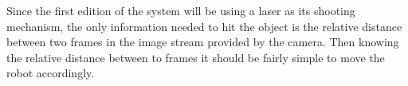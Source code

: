 Since the first edition of the system will be using a laser as its shooting mechanism, the only information needed to hit the object is the relative distance between two frames in the image stream provided by the camera. 
Then knowing the relative distance between to frames it should be fairly simple to move the robot accordingly.